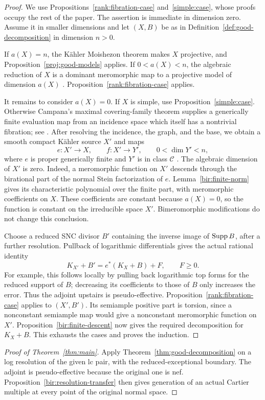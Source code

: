 \begin{proof}
We use Propositions~\ref{rank:fibration-case} and~\ref{simple:case}, whose
proofs occupy the rest of the paper. The assertion is immediate in dimension
zero. Assume it in smaller dimensions and let \((X,B)\) be as in
Definition~\ref{def:good-decomposition} in dimension \(n>0\).

If \(a(X)=n\), the Kähler Moishezon theorem makes \(X\) projective, and
Proposition~\ref{proj:good-models} applies. If \(0<a(X)<n\), the algebraic
reduction of \(X\) is a dominant meromorphic map to a projective model of
dimension \(a(X)\) \cite[Theorem and Definition~3.1]{CampanaPeternell1999}.
Proposition~\ref{rank:fibration-case} applies.

It remains to consider \(a(X)=0\). If \(X\) is simple, use
Proposition~\ref{simple:case}. Otherwise Campana's maximal covering-family
theorem supplies a generically finite evaluation map from an incidence
space which itself has a nontrivial fibration; see
\cite[Lemma~17 and Corollary~18]{Campana2026}. After resolving the incidence,
the graph, and the base, we obtain a smooth compact Kähler source \(X'\) and maps
\[
 e:X'\longrightarrow X,\qquad f:X'\longrightarrow Y',
 \qquad 0<\dim Y'<n,
\]
where \(e\) is proper generically finite and \(Y'\) is in class
\(\mathcal C\) \cite[(1.1.1), (1.5)(3)--(4), (2.2)(1),(3), and (2.3)]{Fujiki1982}.
The algebraic dimension of \(X'\) is zero. Indeed, a
meromorphic function on \(X'\) descends through the birational part of the
normal Stein factorization of \(e\). Lemma~\ref{bir:finite-norm} gives its
characteristic polynomial over the finite part, with meromorphic
coefficients on \(X\). These coefficients are constant because \(a(X)=0\),
so the function is constant on the irreducible space \(X'\). Bimeromorphic
modifications do not change this conclusion.

Choose a reduced SNC divisor \(B'\) containing the inverse image of
\(\operatorname{Supp} B\), after a further resolution. Pullback of logarithmic
differentials gives the actual rational identity
\[
 K_{X'}+B'=e^*(K_X+B)+F,\qquad F\geq0.
\]
For example, this follows locally by pulling back logarithmic top forms
for the reduced support of \(B\); decreasing its coefficients to those of
\(B\) only increases the error. Thus the adjoint upstairs is
pseudo-effective. Proposition~\ref{rank:fibration-case} applies to
\((X',B')\). Its semiample positive part is torsion, since a nonconstant
semiample map would give a nonconstant meromorphic function on \(X'\).
Proposition~\ref{bir:finite-descent} now gives the required decomposition
for \(K_X+B\). This exhausts the cases and proves the induction.
\end{proof}

\begin{proof}[Proof of Theorem~\ref{thm:main}]
Apply Theorem~\ref{thm:good-decomposition} on a log resolution of the
given lc pair, with the reduced-exceptional boundary. The adjoint is
pseudo-effective because the original one is nef.
Proposition~\ref{bir:resolution-transfer} then gives generation of an
actual Cartier multiple at every point of the original normal space.
\end{proof}
